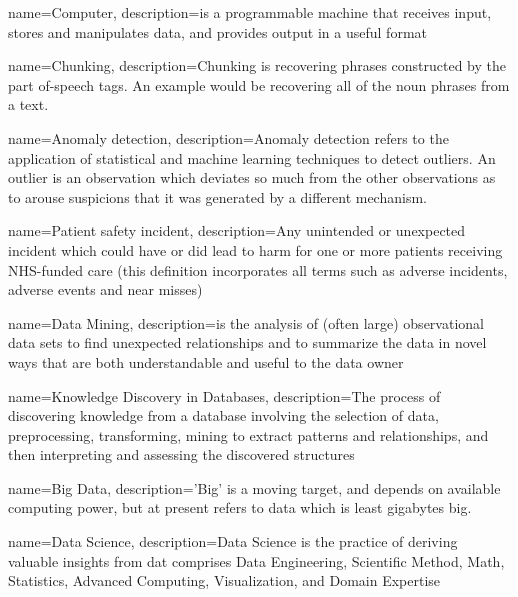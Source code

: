 {
  name=Computer,
  description={is a programmable machine that receives input,
               stores and manipulates data, and provides
               output in a useful format}
}

{
  name=Chunking,
  description={Chunking is recovering phrases constructed by the part of-speech tags. An example would be recovering all of the noun phrases from a text.}
}

{
  name=Anomaly detection,
  description={Anomaly detection refers to the application of statistical and machine learning techniques to detect outliers. An outlier is an observation which deviates so much from the other observations as to arouse suspicions that it was generated by a different mechanism.}
}

{
  name=Patient safety incident,
  description={Any unintended or unexpected incident which could have or did lead to harm for one or more patients receiving NHS-funded care (this definition incorporates all terms such as adverse incidents, adverse events and near misses)}
}



{
  name=Data Mining,
  description={is the analysis of (often large) observational data sets to find unexpected
  relationships and to summarize the data in novel ways that are both understandable and useful to the data owner}
}

{
  name=Knowledge Discovery in Databases,
  description={The process of discovering knowledge from a database involving the selection of data, preprocessing,
  transforming, mining to extract patterns and relationships, and then interpreting and assessing the discovered structures}
}

{
  name=Big Data,
  description={'Big' is a moving target, and depends on available computing power, but at present refers to data which is least gigabytes big.}
}


{
  name=Data Science,
  description={Data Science is the practice of deriving valuable insights from dat comprises Data Engineering, Scientific Method, Math, Statistics, Advanced Computing, Visualization, and Domain Expertise}
}

